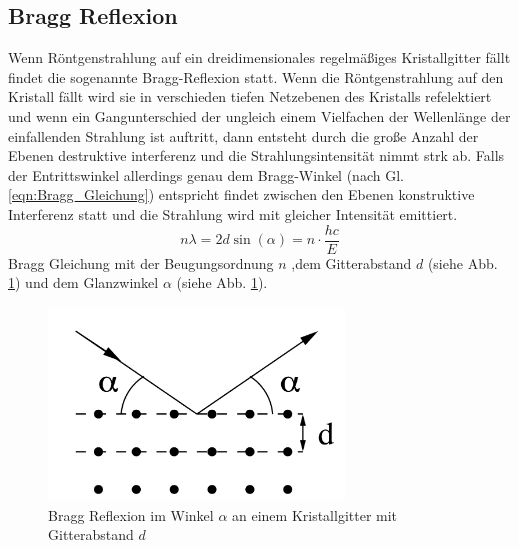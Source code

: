 \subsection{Bragg Reflexion}
Wenn Röntgenstrahlung auf ein dreidimensionales regelmäßiges Kristallgitter fällt findet die sogenannte Bragg-Reflexion statt.
Wenn die Röntgenstrahlung auf den Kristall fällt wird sie in verschieden tiefen Netzebenen des Kristalls refelektiert und wenn ein Gangunterschied der ungleich einem Vielfachen der Wellenlänge der einfallenden Strahlung ist auftritt, dann entsteht durch die große Anzahl der Ebenen destruktive interferenz und die Strahlungsintensität nimmt strk ab.
Falls der Entrittswinkel allerdings genau dem Bragg-Winkel (nach Gl. \ref{eqn:Bragg_Gleichung}) entspricht findet zwischen den Ebenen konstruktive Interferenz statt und die Strahlung wird mit gleicher Intensität emittiert.
\begin{equation*}
    n\lambda = 2 d \sin(\alpha) = n\cdot \frac{hc}{E} \label{eqn:Bragg_Gleichung}
\end{equation*}
Bragg Gleichung mit der Beugungsordnung $n$ ,dem Gitterabstand $d$ (siehe Abb. \ref{fig:Bragg_Reflexion}) und dem Glanzwinkel $\alpha$ (siehe Abb. \ref{fig:Bragg_Reflexion}).
\begin{figure}
    \centering
    \includegraphics[width=0.7\textwidth]{bilder/Bragg_Reflexion.png}
    \caption{Bragg Reflexion im Winkel $\alpha$ an einem Kristallgitter mit Gitterabstand $d$ }
    \label{fig:Bragg_Reflexion}
\end{figure}

